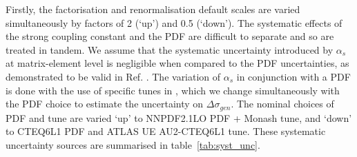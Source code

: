%
%
Firstly, the factorisation and renormalisation default scales are varied simultaneously by factors of 2 (`up') and 0.5 (`down'). The systematic effects of the strong coupling constant and the PDF are difficult to separate and so are treated in tandem. We assume that the systematic uncertainty introduced by $\alpha_{s}$ at matrix-element level is negligible when compared to the PDF uncertainties, as demonstrated to be valid in Ref. \cite{CERN-THESIS-2015-038}. The variation of $\alpha_{s}$ in conjunction with a PDF is done with the use of specific tunes in \PYTHIA, which we change simultaneously with the PDF choice to estimate the uncertainty on $\Delta \sigma_{gen}$. The nominal choices of PDF and tune are varied `up' to NNPDF2.1LO PDF + Monash tune, and `down' to CTEQ6L1 PDF and ATLAS UE AU2-CTEQ6L1 tune.  These systematic uncertainty sources are summarised in table~\ref{tab:syst_unc}.

